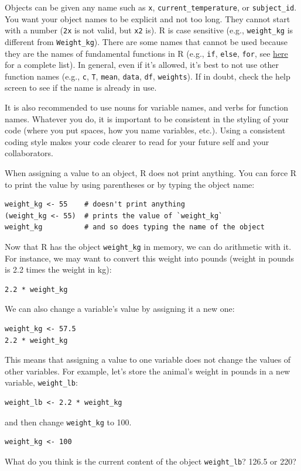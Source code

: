 \documentclass[11pt]{article}
\begin{document}
Objects can be given any name such as \texttt{x}, \texttt{current\_temperature}, or \texttt{subject\_id}. You want your object names to be explicit and not too long. They cannot start with a number (\texttt{2x} is not valid, but \texttt{x2} is). R is case sensitive (e.g., \texttt{weight\_kg} is different from \texttt{Weight\_kg}). There are some names that cannot be used because they are the names of fundamental functions in R (e.g., \texttt{if}, \texttt{else}, \texttt{for}, see \href{https://stat.ethz.ch/R-manual/R-devel/library/base/html/Reserved.html}{here} for a complete list). In general, even if it's allowed, it's best to not use other function names (e.g., \texttt{c}, \texttt{T}, \texttt{mean}, \texttt{data}, \texttt{df}, \texttt{weights}). If in doubt, check the help screen to see if the name is already in use. 

It is also recommended to use nouns for variable names, and verbs for function names. Whatever you do, it is important to be consistent in the styling of your code (where you put spaces, how you name variables, etc.). Using a consistent coding style makes your code clearer to read for your future self and your collaborators. 

When assigning a value to an object, R does not print anything. You can force R to print the value by using parentheses or by typing the object name:

\begin{verbatim}
weight_kg <- 55    # doesn't print anything
(weight_kg <- 55)  # prints the value of `weight_kg`
weight_kg          # and so does typing the name of the object
\end{verbatim}

Now that R has the object \texttt{weight\_kg} in memory, we can do arithmetic with it. For instance, we may want to convert this weight into pounds (weight in pounds is 2.2 times the weight in kg):

\begin{verbatim}
2.2 * weight_kg
\end{verbatim}

We can also change a variable's value by assigning it a new one:

\begin{verbatim}
weight_kg <- 57.5
2.2 * weight_kg
\end{verbatim}

This means that assigning a value to one variable does not change the values of other variables.  For example, let's store the animal's weight in pounds in a new variable, \texttt{weight\_lb}:

\begin{verbatim}
weight_lb <- 2.2 * weight_kg
\end{verbatim}

and then change \texttt{weight\_kg} to 100.

\begin{verbatim}
weight_kg <- 100
\end{verbatim}

What do you think is the current content of the object \texttt{weight\_lb}? 126.5 or 220?
\end{document}
